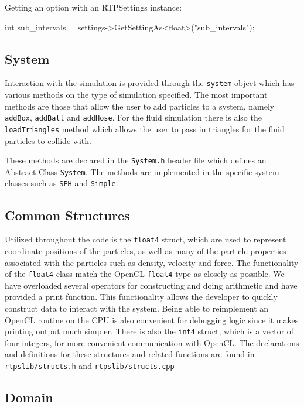\noindent Getting an option with an RTPSettings instance:
\begin{cppcode}{0}
int sub_intervals =  settings->GetSettingAs<float>("sub_intervals");
\end{cppcode}

\subsection{System}

Interaction with the simulation is provided through the \verb|system| object
which has various methods on the type of simulation specified.  The most
important methods are those that allow the user to add particles to a system,
namely \verb|addBox|, \verb|addBall| and \verb|addHose|. For the fluid
simulation there is also the \verb|loadTriangles| method which allows the user
to pass in triangles for the fluid particles to collide with.

These methods are declared in the \verb|System.h| header file which defines an
Abstract Class \verb|System|. The methods are implemented in the specific
system classes such as \verb|SPH| and \verb|Simple|.

\subsection{Common Structures}

Utilized throughout the code is the \verb|float4| struct, which are used to
represent coordinate positions of the particles, as well as many of the
particle properties associated with the particles such as density, velocity and
force.  The functionality of the \verb|float4| class match the OpenCL
\verb|float4| type as closely as possible. We have overloaded several operators
for constructing and doing arithmetic and have provided a print function.
This functionality allows the developer to quickly construct data to 
interact with the system. Being able to reimplement an OpenCL routine on
the CPU is also convenient for debugging logic since it makes printing output
much simpler.  There is also the \verb|int4| struct, which is a vector
of four integers, for more convenient communication with OpenCL. The
declarations and definitions for these structures and related functions are 
found in \verb|rtpslib/structs.h| and \verb|rtpslib/structs.cpp|


\subsection{Domain}

